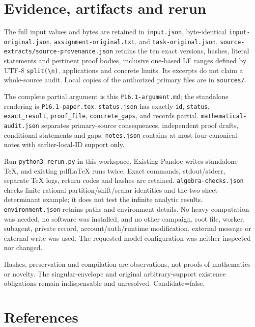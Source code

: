\documentclass[
  10pt,
]{article}
\begin{document}
\section{Evidence, artifacts and
rerun}\label{evidence-artifacts-and-rerun}

The full input values and bytes are retained in \texttt{input.json},
byte-identical \texttt{input-original.json},
\texttt{assignment-original.txt}, and \texttt{task-original.json}.
\texttt{source-extracts/source-provenance.json} retains the ten exact
versions, hashes, literal statements and pertinent proof bodies,
inclusive one-based LF ranges defined by UTF-8
\texttt{split(\textquotesingle{}\textbackslash{}n\textquotesingle{})},
applications and concrete limits. Its excerpts do not claim a
whole-source audit. Local copies of the authorized primary files are in
\texttt{sources/}.

The complete partial argument is this \texttt{P16.1-argument.md}; the
standalone rendering is \texttt{P16.1-paper.tex}. \texttt{status.json}
has exactly \texttt{id}, \texttt{status}, \texttt{exact\_result},
\texttt{proof\_file}, \texttt{concrete\_gaps}, and records partial.
\texttt{mathematical-audit.json} separates primary-source consequences,
independent proof drafts, conditional statements and gaps.
\texttt{notes.json} contains at most four canonical notes with
earlier-local-ID support only.

Run \texttt{python3\ rerun.py} in this workspace. Existing Pandoc writes
standalone TeX, and existing pdfLaTeX runs twice. Exact commands,
stdout/stderr, separate TeX logs, return codes and hashes are retained.
\texttt{algebra-checks.json} checks finite rational
partition/shift/scalar identities and the two-sheet determinant example;
it does not test the infinite analytic results.
\texttt{environment.json} retains paths and environment details. No
heavy computation was needed, no software was installed, and no other
campaign, root file, worker, subagent, private record,
account/auth/runtime modification, external message or external write
was used. The requested model configuration was neither inspected nor
changed.

Hashes, preservation and compilation are observations, not proofs of
mathematics or novelty. The singular-envelope and original
arbitrary-support existence obligations remain indispensable and
unresolved. Candidate=false.

\section{References}\label{references}
\end{document}
